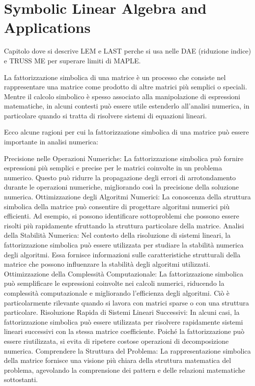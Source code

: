 
\chapter{Symbolic Linear Algebra and Applications}
\label{chap5:chap:symbolic_linear_algebra}


Capitolo dove si descrive LEM e LAST perche si usa nelle DAE (riduzione indice) e TRUSS ME per superare limiti di MAPLE.

La fattorizzazione simbolica di una matrice è un processo che consiste nel rappresentare una matrice come prodotto di altre matrici più semplici o speciali. Mentre il calcolo simbolico è spesso associato alla manipolazione di espressioni matematiche, in alcuni contesti può essere utile estenderlo all'analisi numerica, in particolare quando si tratta di risolvere sistemi di equazioni lineari.

Ecco alcune ragioni per cui la fattorizzazione simbolica di una matrice può essere importante in analisi numerica:

Precisione nelle Operazioni Numeriche:
La fattorizzazione simbolica può fornire espressioni più semplici e precise per le matrici coinvolte in un problema numerico. Questo può ridurre la propagazione degli errori di arrotondamento durante le operazioni numeriche, migliorando così la precisione della soluzione numerica.
Ottimizzazione degli Algoritmi Numerici:
La conoscenza della struttura simbolica della matrice può consentire di progettare algoritmi numerici più efficienti. Ad esempio, si possono identificare sottoproblemi che possono essere risolti più rapidamente sfruttando la struttura particolare della matrice.
Analisi della Stabilità Numerica:
Nel contesto della risoluzione di sistemi lineari, la fattorizzazione simbolica può essere utilizzata per studiare la stabilità numerica degli algoritmi. Essa fornisce informazioni sulle caratteristiche strutturali della matrice che possono influenzare la stabilità degli algoritmi utilizzati.
Ottimizzazione della Complessità Computazionale:
La fattorizzazione simbolica può semplificare le espressioni coinvolte nei calcoli numerici, riducendo la complessità computazionale e migliorando l'efficienza degli algoritmi. Ciò è particolarmente rilevante quando si lavora con matrici sparse o con una struttura particolare.
Risoluzione Rapida di Sistemi Lineari Successivi:
In alcuni casi, la fattorizzazione simbolica può essere utilizzata per risolvere rapidamente sistemi lineari successivi con la stessa matrice coefficiente. Poiché la fattorizzazione può essere riutilizzata, si evita di ripetere costose operazioni di decomposizione numerica.
Comprendere la Struttura del Problema:
La rappresentazione simbolica della matrice fornisce una visione più chiara della struttura matematica del problema, agevolando la comprensione dei pattern e delle relazioni matematiche sottostanti.

